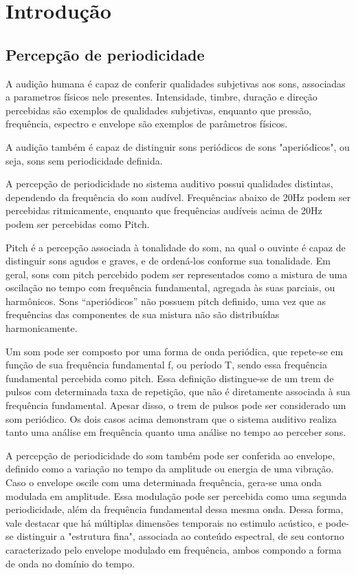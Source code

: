 \chapter{Introdu{\c c}\~ao}
\section{Percepção de periodicidade}
A audição humana é capaz de conferir qualidades subjetivas aos sons, associadas
a parametros físicos nele presentes. Intensidade, timbre, duração e direção percebidas
são exemplos de qualidades subjetivas, enquanto que pressão, frequência,
espectro e envelope são exemplos de parâmetros físicos.\cite{rossing2002}

A audição também é capaz de distinguir sons periódicos de sons "aperiódicos", ou seja,
 sons sem periodicidade definida.

A percepção de periodicidade no sistema auditivo possui qualidades distintas,
 dependendo da frequência do som audível. Frequências abaixo de
20Hz podem ser percebidas ritmicamente, enquanto que frequências audíveis acima de
 20Hz podem ser percebidas como Pitch.

Pitch é a percepção associada à tonalidade do som, na qual o ouvinte é capaz
de distinguir sons agudos e graves, e de ordená-los conforme sua tonalidade.
 Em geral, sons com pitch percebido podem ser representados como a mistura de uma
oscilação no tempo com frequência fundamental, agregada às suas parciais, ou
 harmônicos. Sons ``aperiódicos'' não possuem pitch definido, uma vez que as frequências das
 componentes de sua mistura não são distribuídas harmonicamente. \cite{langner1992} \cite{angus2009} 

 Um som pode ser composto por uma forma de onda periódica, que
 repete-se em função de sua frequência fundamental f, ou período T, sendo essa 
 frequência fundamental percebida como pitch. Essa definição distingue-se de um
 trem de pulsos com determinada taxa de repetição, que não é diretamente
 associada à sua frequência fundamental. Apesar disso, o trem de pulsos pode ser
considerado um som periódico. Os dois casos acima demonstram que o sistema
auditivo realiza tanto uma análise em frequência quanto uma análise no tempo
ao perceber sons. \cite{rossing2002}  


A percepção de periodicidade do som também pode ser conferida ao envelope,
definido como a variação no tempo da amplitude ou energia de uma vibração.
Caso o envelope oscile com uma determinada frequência, gera-se uma onda
modulada em amplitude.
Essa modulação pode ser percebida como uma segunda periodicidade,
além da frequência fundamental dessa mesma onda. Dessa forma, vale destacar
que há múltiplas dimensões temporais no estimulo acústico, e pode-se distinguir
a "estrutura fina", associada ao conteúdo espectral, de seu contorno caracterizado
pelo envelope modulado em frequência, ambos compondo a forma de onda no
domínio do tempo. \cite{joris2004}

